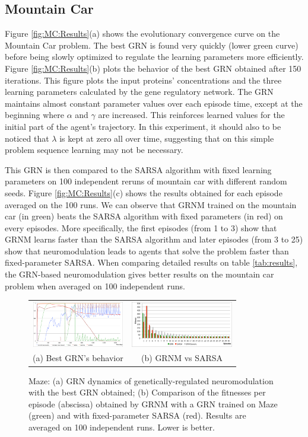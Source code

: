 \subsection{Mountain Car}
Figure \ref{fig:MC:Results}(a) shows the evolutionary convergence curve on the Mountain Car problem. The best GRN is found very quickly (lower green curve) before being slowly optimized to regulate the learning parameters more efficiently. Figure \ref{fig:MC:Results}(b) plots the behavior of the best GRN obtained after 150 iterations. This figure plots the input proteins' concentrations and the three learning parameters calculated by the gene regulatory network. The GRN maintains almost constant parameter values over each episode time, except at the beginning where $\alpha$ and $\gamma$ are increased. This reinforces learned values for the initial part of the agent's trajectory. In this experiment, it should also to be noticed that $\lambda$ is kept at zero all over time, suggesting that on this simple problem sequence learning may not be necessary.



This GRN is then compared to the SARSA algorithm with fixed learning parameters on 100 independent reruns of mountain car with different random seeds. Figure \ref{fig:MC:Results}(c) shows the results obtained for each episode averaged on the 100 runs. We can observe that GRNM trained on the mountain car (in green) beats the SARSA algorithm with fixed parameters (in red) on every episodes. More specifically, the first episodes (from 1 to 3) show that GRNM learns faster than the SARSA algorithm and later episodes (from 3 to 25) show that neuromodulation leads to agents that solve the problem faster than fixed-parameter SARSA. When comparing detailed results on table \ref{tab:results}, the GRN-based neuromodulation gives better results on the mountain car problem when averaged on 100 independent runs. 



\begin{figure}[b!]
\setlength{\tabcolsep}{0.5mm}
\begin{tabular}{cc}
\includegraphics[height=2cm]{MZ_GRNBehavior.pdf}&
\includegraphics[height=2cm]{MZ_GRNvsSARSA.pdf}\\
(a) Best GRN's behavior &
(b) GRNM vs SARSA
\end{tabular}
\caption{Maze: (a) GRN dynamics of genetically-regulated neuromodulation with the best GRN obtained; (b) Comparison of the fitnesses per episode (abscissa) obtained by GRNM with a GRN trained on Maze (green) and with fixed-parameter SARSA (red). Results are averaged on 100 independent runs. Lower is better.}\label{fig:MZ:Results}
\end{figure}

